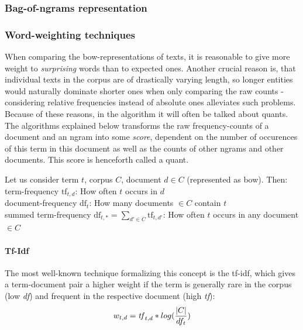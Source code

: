 \subsubsection{Bag-of-ngrams representation}
\label{sec:techniques:bow}



\subsubsection{Word-weighting techniques}
\label{sec:word_count_techniques}


When comparing the \gls{bow}-representations of texts, it is reasonable to give more weight to \emph{surprising} words than to expected ones.  \cite[156]{Turney2010} Another crucial reason is, that individual texts in the corpus are of drastically varying length, so longer entities would naturally dominate shorter ones when only comparing the raw counts - considering relative frequencies instead of absolute ones alleviates such problems. Because of these reasons, in the algorithm it will often be talked about \glspl{quant}. The algorithms explained below transforms the raw frequency-counts of a document and an \gls{ngram} into some \emph{score}, dependent on the number of occurences of this term in this document as well as the counts of other \glspl{ngram} and other documents. This score is henceforth called a \gls{quant}.

Let us consider term $t$, corpus $C$, document $d \in C$ (represented as \gls{bow}). Then:\\
term-frequency $\text{tf}_{t,d}$: How often $t$ occurs in $d$\\
document-frequency $\text{df}_t$: How many documents $\in C$ contain $t$\\
summed term-frequency $\text{df}_{t,*} = \sum_{d' \in C} \text{tf}_{t,d'}$: How often $t$ occurs in any document $\in C$

\paragraph{Tf-Idf} The most well-known technique formalizing this concept is the \gls{tf-idf}, which gives a term-document pair a higher weight if the term is generally rare in the corpus (low \textit{df}) and frequent in the respective document (high \textit{tf}):
\vspace{-2.5ex}
$$ w_{t,d} = \text{\textit{tf}}_{t,d} * log(\frac{|C|}{df_t}) $$

